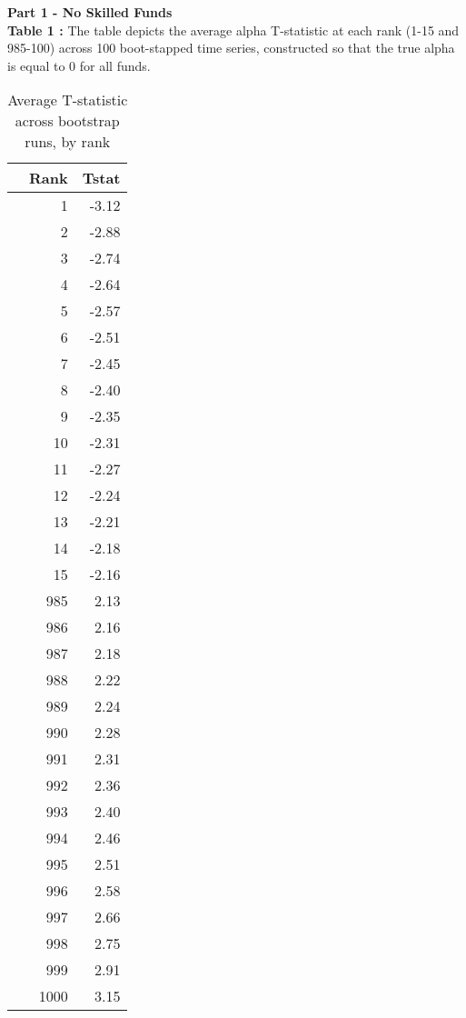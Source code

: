\documentclass{article}
\begin{document}
\textbf{Part 1 - No Skilled Funds} \\\textbf{Table 1 : }The table depicts the average alpha T-statistic at each rank (1-15 and 985-100) across 100 boot-stapped time series, constructed so that the true alpha is equal to 0 for all funds.\begin{center}
\begin{table}[h]
\centering
\caption{Average T-statistic across bootstrap runs, by rank}
\begin{tabular}{lrr}
\toprule
{} &  Rank &  Tstat \\
\midrule
{} &     1 &  -3.12 \\
{} &     2 &  -2.88 \\
{} &     3 &  -2.74 \\
{} &     4 &  -2.64 \\
{} &     5 &  -2.57 \\
{} &     6 &  -2.51 \\
{} &     7 &  -2.45 \\
{} &     8 &  -2.40 \\
{} &     9 &  -2.35 \\
{} &    10 &  -2.31 \\
{} &    11 &  -2.27 \\
{} &    12 &  -2.24 \\
{} &    13 &  -2.21 \\
{} &    14 &  -2.18 \\
{} &    15 &  -2.16 \\
{} &   985 &   2.13 \\
{} &   986 &   2.16 \\
{} &   987 &   2.18 \\
{} &   988 &   2.22 \\
{} &   989 &   2.24 \\
{} &   990 &   2.28 \\
{} &   991 &   2.31 \\
{} &   992 &   2.36 \\
{} &   993 &   2.40 \\
{} &   994 &   2.46 \\
{} &   995 &   2.51 \\
{} &   996 &   2.58 \\
{} &   997 &   2.66 \\
{} &   998 &   2.75 \\
{} &   999 &   2.91 \\
{} &  1000 &   3.15 \\
\bottomrule
\end{tabular}
\end{table}
\end{center}
\end{document}
